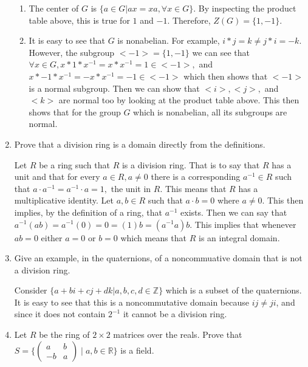 \documentclass[11pt]{article}
\newcommand{\R}{\mathbb{R}}
\newcommand{\Z}{\mathbb{Z}}
\begin{document}
\begin{enumerate}
\begin{enumerate}
    \item
    
    The center of $G$ is $\{a\in G|ax = xa, \forall x\in G\}$. By inspecting the product table above, this is true for $1$ and $-1$. Therefore, $Z(G)=\{1, -1\}$.
    
    \item
    
    It is easy to see that $G$ is nonabelian. For example, $i*j = k \neq j * i = -k$. However, the subgroup $<-1> = \{1, -1\}$ we can see that $\forall x\in G, x*1*x^{-1} = x*x^{-1} = 1 \in <-1>,$ and $x*-1*x^{-1} = -x*x^{-1} = -1\in <-1>$ which then shows that $<-1>$ is a normal subgroup. Then we can show that $<i>, <j>,$ and $<k>$ are normal too by looking at the product table above. This then shows that for the group $G$ which is nonabelian, all its subgroups are normal.
    
\end{enumerate}

\pagebreak

\item Prove that a division ring is a domain directly from the definitions.

Let $R$ be a ring such that $R$ is a division ring. That is to say that $R$ has a unit and that for every $a\in R, a\neq 0$ there is a corresponding $a^{-1}\in R$ such that $a\cdot a^{-1}=a^{-1}\cdot a = 1,$ the unit in $R.$ This means that $R$ has a multiplicative identity. Let $a, b\in R$ such that $a\cdot b = 0$ where $a\neq 0$. This then implies, by the definition of a ring, that $a^{-1}$ exists. Then we can say that $a^{-1}(ab) = a^{-1}(0) = 0 = (1)b = (a^{-1}a) b$. This implies that whenever $ab=0$ either $a=0$ or $b=0$ which means that $R$ is an integral domain.

\pagebreak

\item Give an example, in the quaternions, of a noncommuative domain
that is not a division ring.

Consider $\{a+bi+cj+dk|a, b, c, d\in \Z\}$ which is a subset of the quaternions. It is easy to see that this is a noncommutative domain because $ij\neq ji$, and since it does not contain $2^{-1}$ it cannot be a division ring.

\pagebreak

\item Let $R$ be the ring of $2 \times 2$ matrices over the reals.
Prove that $S = \{ \begin{pmatrix} a & b \\ -b & a \end{pmatrix} \mid 
a, b \in \R \}$ 
is a field.


\end{enumerate}
\end{document}
